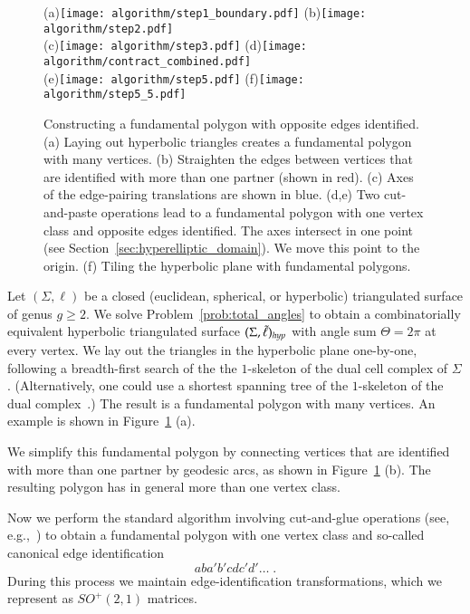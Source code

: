 \documentclass[Thesis]{subfiles}
\begin{document}
\begin{figure}
\centering
(a)\texttt{[image: algorithm/step1\_boundary.pdf]}
(b)\texttt{[image: algorithm/step2.pdf]}
\\
(c)\texttt{[image: algorithm/step3.pdf]}
(d)\texttt{[image: algorithm/contract\_combined.pdf]}
\\
(e)\texttt{[image: algorithm/step5.pdf]}
(f)\texttt{[image: algorithm/step5\_5.pdf]}
\caption{ Constructing a fundamental polygon with opposite edges
  identified.  (a) Laying out hyperbolic triangles creates a
  fundamental polygon with many vertices. (b) Straighten the edges
  between vertices that are identified with more than one partner
  (shown in red). (c) Axes of the edge-pairing translations are shown
  in blue. (d,e) Two cut-and-paste operations lead to a fundamental
  polygon with one vertex class and opposite edges identified. The
  axes intersect in one point (see
  Section~\ref{sec:hyperelliptic_domain}). We move this point to the
  origin. (f) Tiling the hyperbolic plane with fundamental polygons.}
\label{fig:fundamental_polygon_algorithm}
\end{figure}

Let $(\Sigma,\ell)$ be a closed (euclidean, spherical, or
hyperbolic) triangulated surface of genus $g\geq 2$. We solve
Problem~\ref{prob:total_angles} to obtain a combinatorially equivalent
hyperbolic triangulated surface $(\Sigma,\tilde{\ell})_{\mathit{hyp}}$ with angle sum
$\Theta=2\pi$ at every vertex. We lay out the triangles in the
hyperbolic plane one-by-one, following a breadth-first search of the
the $1$-skeleton of the dual cell complex of
$\Sigma$. (Alternatively, one could use a shortest spanning tree of
the $1$-skeleton of the dual complex~\cite{EricksonH02}.) The result is a
fundamental polygon with many vertices. An example is shown in
Figure~\ref{fig:fundamental_polygon_algorithm} (a).

We simplify this fundamental polygon by connecting vertices that are
identified with more than one partner by geodesic arcs, as shown in 
Figure~\ref{fig:fundamental_polygon_algorithm} (b). The resulting
polygon has in general more than one vertex class.

Now we perform the standard algorithm involving cut-and-glue
operations (see, e.g.,~\cite{Jost2007}) to obtain a fundamental
polygon with one vertex class and so-called canonical edge
identification 
\begin{equation}
aba'b'cdc'd'\ldots\;. 
\end{equation}
During this process we maintain
edge-identification transformations, which we represent as
$SO^{+}(2,1)$ matrices. 
\end{document}
